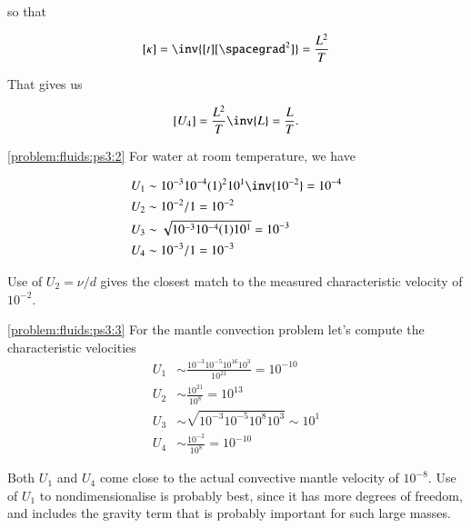 {\begin{enumerate}
so that 

\begin{equation}\label{eqn:continuumProblemSet3:150}
[\kappa] = \inv{[t][\spacegrad^2]} = \frac{L^2}{T}
\end{equation}

That gives us

\begin{equation}\label{eqn:continuumProblemSet3:170}
[U_4] = \frac{L^2}{T} \inv{L} = \frac{L}{T}.
\end{equation}
\end{enumerate}


\ref{problem:fluids:ps3:2} For water at room temperature, we have

\begin{align}\label{eqn:continuumProblemSet3:190}
U_1 &\sim 10^{-3} 10^{-4} (1)^2 10^1 \inv{10^{-2}} = 10^{-4} \\
U_2 &\sim 10^{-2}/1 = 10^{-2} \\
U_3 &\sim \sqrt{ 10^{-3} 10^{-4} (1) 10^1 } = 10^{-3} \\
U_4 &\sim 10^{-3}/1 = 10^{-3}
\end{align}

Use of $U_2 = \nu/d$ gives the closest match to the measured characteristic velocity of $10^{-2}$.

\ref{problem:fluids:ps3:3} For the mantle convection problem let's compute the characteristic velocities
\begin{align}\label{eqn:continuumProblemSet3:210}
U_1 &\sim \frac{10^{-3} 10^{-5} 10^{16} 10^3 }{10^{21}} = 10^{-10} \\
U_2 &\sim \frac{10^{21}}{10^8} = 10^{13} \\
U_3 &\sim \sqrt{ 10^{-3} 10^{-5} 10^8 10^3 } \sim 10^1 \\
U_4 &\sim \frac{10^{-2}}{10^8} = 10^{-10}
\end{align}

Both $U_1$ and $U_4$ come close to the actual convective mantle velocity of $10^{-8}$.  Use of $U_1$ to nondimensionalise is probably best, since it has more degrees of freedom, and includes the gravity term that is probably important for such large masses.

} %

